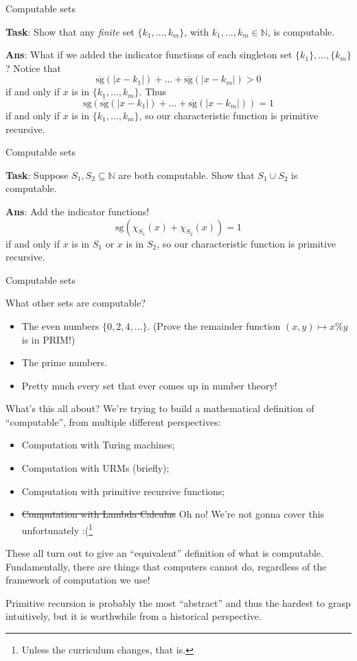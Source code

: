\documentclass{beamer}
\newcommand{\N}{\mathbb N}
\begin{document}
\begin{frame}{Computable sets}

\textbf{Task}: Show that any \textit{finite} set $\{k_1, \ldots, k_m\}$, with $k_1, \ldots, k_m \in \N$, is computable. \pause

\textbf{Ans}: What if we added the indicator functions of each singleton set $\{k_1\}, \ldots, \{k_m\}$? Notice that
$$
\overline{\mathrm{sg}}(|x - k_1|) + \ldots + \overline{\mathrm{sg}}(|x - k_m|) > 0 
$$
if and only if $x$ is in $\{k_1, \ldots, k_m\}$. Thus
$$
\mathrm{sg}(\overline{\mathrm{sg}}(|x - k_1|) + \ldots + \overline{\mathrm{sg}}(|x - k_m|)) = 1
$$
if and only if $x$ is in $\{k_1, \ldots, k_m\}$, so our characteristic function is primitive recursive.
    
\end{frame}

\begin{frame}{Computable sets}

\textbf{Task}: Suppose $S_1, S_2 \subseteq \N$ are both computable. Show that $S_1 \cup S_2$ is computable. \pause

\textbf{Ans}: Add the indicator functions!
$$
\mathrm{sg}(\chi_{S_1}(x) + \chi_{S_2}(x)) = 1
$$
if and only if $x$ is in $S_1$ or $x$ is in $S_2$, so our characteristic function is primitive recursive.
    
\end{frame}

\begin{frame}{Computable sets}

What other sets are computable?
\begin{itemize}
    \item The even numbers $\{0, 2, 4, \ldots\}$. (Prove the remainder function $(x, y) \mapsto x \% y$ is in PRIM!)
    \item The prime numbers.
    \item Pretty much every set that ever comes up in number theory!
\end{itemize}
\end{frame}


\begin{frame}{What's this all about?}
We're trying to build a mathematical definition of ``computable'', from multiple different perspectives:
\begin{itemize}
    \item Computation with Turing machines; \pause
    \item Computation with URMs (briefly); \pause
    \item Computation with primitive recursive functions; \pause
    \item \sout{Computation with Lambda Calculus} Oh no! We're not gonna cover this unfortunately :(\footnote{Unless the curriculum changes, that is.}\pause
\end{itemize}
These all turn out to give an ``equivalent'' definition of what is computable. Fundamentally, there are things that computers cannot do, regardless of the framework of computation we use!


Primitive recursion is probably the most ``abstract'' and thus the hardest to grasp intuitively, but it is worthwhile from a historical perspective.
\end{frame}
\end{document}
